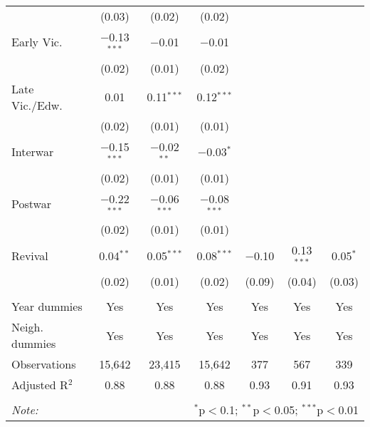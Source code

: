 \begin{table}[!htbp]
\begin{tabular}{@{\extracolsep{5pt}}lcccccc}
  & (0.03) & (0.02) & (0.02) &  &  &  \\ 
  Early Vic. & $-$0.13$^{***}$ & $-$0.01 & $-$0.01 &  &  &  \\ 
  & (0.02) & (0.01) & (0.02) &  &  &  \\ 
  Late Vic./Edw. & 0.01 & 0.11$^{***}$ & 0.12$^{***}$ &  &  &  \\ 
  & (0.02) & (0.01) & (0.01) &  &  &  \\ 
  Interwar & $-$0.15$^{***}$ & $-$0.02$^{**}$ & $-$0.03$^{*}$ &  &  &  \\ 
  & (0.02) & (0.01) & (0.01) &  &  &  \\ 
  Postwar & $-$0.22$^{***}$ & $-$0.06$^{***}$ & $-$0.08$^{***}$ &  &  &  \\ 
  & (0.02) & (0.01) & (0.01) &  &  &  \\ 
  Revival & 0.04$^{**}$ & 0.05$^{***}$ & 0.08$^{***}$ & $-$0.10 & 0.13$^{***}$ & 0.05$^{*}$ \\ 
  & (0.02) & (0.01) & (0.02) & (0.09) & (0.04) & (0.03) \\ 
 \hline \\[-1.8ex] 
Year dummies & Yes & Yes & Yes & Yes & Yes & Yes \\ 
Neigh. dummies & Yes & Yes & Yes & Yes & Yes & Yes \\ 
Observations & 15,642 & 23,415 & 15,642 & 377 & 567 & 339 \\ 
Adjusted R$^{2}$ & 0.88 & 0.88 & 0.88 & 0.93 & 0.91 & 0.93 \\ 
\hline 
\hline \\[-1.8ex] 
\textit{Note:}  & \multicolumn{6}{r}{$^{*}$p$<$0.1; $^{**}$p$<$0.05; $^{***}$p$<$0.01} \\ 
\end{tabular} 
\end{table} 
